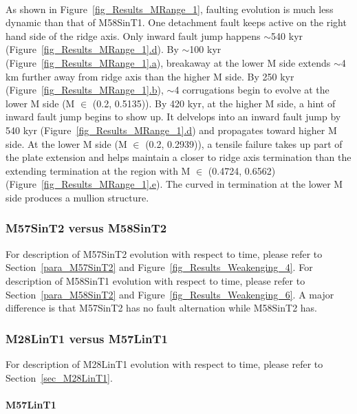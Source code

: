 ~\\
As shown in Figure~\hyperref[fig_Results_MRange_1]{\ref{fig_Results_MRange_1}}, faulting evolution is much less dynamic than that of M58SinT1. One detachment fault keeps active on the right hand side of the ridge axis. Only inward fault jump happens $\sim$540 kyr (Figure~\hyperref[fig_Results_MRange_1]{\ref{fig_Results_MRange_1}.d}). By $\sim$100 kyr (Figure~\hyperref[fig_Results_MRange_1]{\ref{fig_Results_MRange_1}.a}), breakaway at the lower M side extends $\sim$4 km further away from ridge axis than the higher M side. By 250 kyr (Figure~\hyperref[fig_Results_MRange_1]{\ref{fig_Results_MRange_1}.b}), $\sim$4 corrugations begin to evolve at the lower M side (M $\in$ (0.2, 0.5135)). By 420 kyr, at the higher M side, a hint of inward fault jump begins to show up. It delvelops into an inward fault jump by 540 kyr (Figure~\hyperref[fig_Results_MRange_1]{\ref{fig_Results_MRange_1}.d}) and propagates toward higher M side. At the lower M side (M $\in$ (0.2, 0.2939)), a tensile failure takes up part of the plate extension and helps maintain a closer to ridge axis termination than the extending termination at the region with M $\in$ (0.4724, 0.6562) (Figure~\hyperref[fig_Results_MRange_1]{\ref{fig_Results_MRange_1}.e}). The curved in termination at the lower M side produces a mullion structure.

\subsubsection{M57SinT2 versus M58SinT2}

For description of M57SinT2 evolution with respect to time, please refer to Section~\hyperref[para_M57SinT2]{\ref{para_M57SinT2}} and Figure~\hyperref[fig_Results_Weakenging_4]{\ref{fig_Results_Weakenging_4}}. For description of M58SinT1 evolution with respect to time, please refer to Section~\hyperref[para_M58SinT2]{\ref{para_M58SinT2}} and Figure~\hyperref[fig_Results_Weakenging_6]{\ref{fig_Results_Weakenging_6}}. A major difference is that M57SinT2 has no fault alternation while M58SinT2 has.

\subsubsection{M28LinT1 versus M57LinT1}

For description of M28LinT1 evolution with respect to time, please refer to Section~\hyperref[sec_M28LinT1]{\ref{sec_M28LinT1}}.

\paragraph{M57LinT1}\label{para_M57LinT1}

